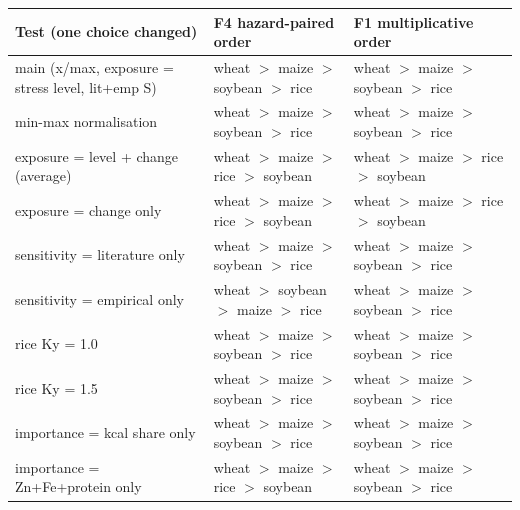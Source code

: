 \begin{tabular}{lll}
\toprule
Test (one choice changed) & F4 hazard-paired order & F1 multiplicative order\\
\midrule
main (x/max, exposure = stress level, lit+emp S) & wheat $>$ maize $>$ soybean $>$ rice & wheat $>$ maize $>$ soybean $>$ rice \\
min-max normalisation & wheat $>$ maize $>$ soybean $>$ rice & wheat $>$ maize $>$ soybean $>$ rice \\
exposure = level + change (average) & wheat $>$ maize $>$ rice $>$ soybean & wheat $>$ maize $>$ rice $>$ soybean \\
exposure = change only & wheat $>$ maize $>$ rice $>$ soybean & wheat $>$ maize $>$ rice $>$ soybean \\
sensitivity = literature only & wheat $>$ maize $>$ soybean $>$ rice & wheat $>$ maize $>$ soybean $>$ rice \\
sensitivity = empirical only & wheat $>$ soybean $>$ maize $>$ rice & wheat $>$ maize $>$ soybean $>$ rice \\
rice Ky = 1.0 & wheat $>$ maize $>$ soybean $>$ rice & wheat $>$ maize $>$ soybean $>$ rice \\
rice Ky = 1.5 & wheat $>$ maize $>$ soybean $>$ rice & wheat $>$ maize $>$ soybean $>$ rice \\
importance = kcal share only & wheat $>$ maize $>$ soybean $>$ rice & wheat $>$ maize $>$ soybean $>$ rice \\
importance = Zn+Fe+protein only & wheat $>$ maize $>$ rice $>$ soybean & wheat $>$ maize $>$ soybean $>$ rice \\
\bottomrule
\end{tabular}
